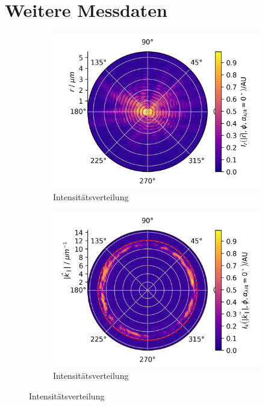 \documentclass[a4paper, titlepage,  ngerman, fullpage]{book}
\begin{document}
	\chapter{Weitere Messdaten}
	\begin{figure}[H]		
		\centering
		\begin{subfigure}{0.49\textwidth}
			\centering
			\includegraphics[width=\textwidth]{figures/new/B_1_fp_0.png}
			\caption{Intensitätsverteilung}
			\label{fig:dirt_polar_fp}
		\end{subfigure}
		\begin{subfigure}{0.5\textwidth}
			\centering
			\includegraphics[width=\textwidth]{figures/new/B_1_bfp_90.png}
			\caption{Intensitätsverteilung}
			\label{fig:dirt_polar}

\end{subfigure}
\end{figure}
\end{document}
